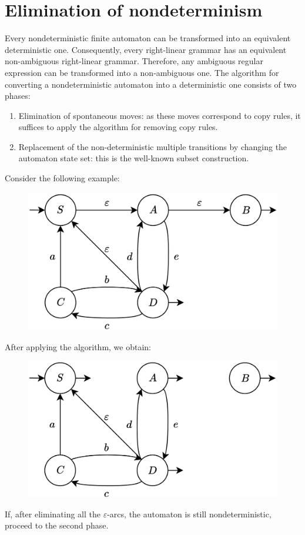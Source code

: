 \section{Elimination of nondeterminism}

Every nondeterministic finite automaton can be transformed into an equivalent deterministic one. 
Consequently, every right-linear grammar has an equivalent non-ambiguous right-linear grammar. 
Therefore, any ambiguous regular expression can be transformed into a non-ambiguous one. 
The algorithm for converting a nondeterministic automaton into a deterministic one consists of two phases:
\begin{enumerate}
    \item Elimination of spontaneous moves: as these moves correspond to copy rules, it suffices to apply the algorithm for removing copy rules.
    \item Replacement of the non-deterministic multiple transitions by changing the automaton state set: this is the well-known subset construction.
\end{enumerate}
\begin{example}
    Consider the following example:
    \begin{figure}[H]
        \centering
        \includegraphics[width=0.5\linewidth]{images/oaut.png}
    \end{figure}
    After applying the algorithm, we obtain:
    \begin{figure}[H]
        \centering
        \includegraphics[width=0.5\linewidth]{images/faut.png}
    \end{figure}
    If, after eliminating all the $\varepsilon$-arcs, the automaton is still nondeterministic, proceed to the second phase.
\end{example}